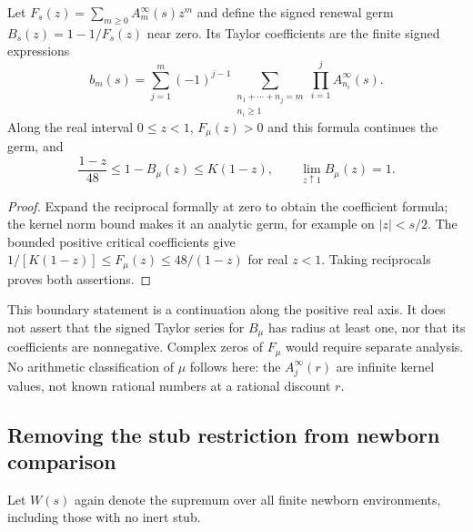 \begin{corollary}
\label{cr:renewal-boundary}
Let $F_s(z)=\sum_{m\ge0}A_m^\infty(s)z^m$ and define the signed
renewal germ $B_s(z)=1-1/F_s(z)$ near zero. Its Taylor coefficients are
the finite signed expressions
\[
 b_m(s)=
 \sum_{j=1}^{m}(-1)^{j-1}
 \sum_{\substack{n_1+\cdots+n_j=m\\n_i\ge1}}
 \prod_{i=1}^{j} A_{n_i}^\infty(s).
\]
Along the real interval
$0\le z<1$, $F_\mu(z)>0$ and this formula continues the germ, and
\[
 \frac{1-z}{48}\le1-B_\mu(z)\le K(1-z),
 \qquad \lim_{z\uparrow1}B_\mu(z)=1.
\]
\end{corollary}
\begin{proof}
Expand the reciprocal formally at zero to obtain the coefficient formula;
the kernel norm bound makes it an analytic germ, for example on
$|z|<s/2$. The bounded positive critical coefficients give
$1/[K(1-z)]\le F_\mu(z)\le48/(1-z)$ for real $z<1$.
Taking reciprocals proves both assertions.
\end{proof}

This boundary statement is a continuation along the positive real
axis.  It does not assert that the signed Taylor series for $B_\mu$
has radius at least one, nor that its coefficients are nonnegative.
Complex zeros of $F_\mu$ would require separate analysis.  No arithmetic
classification of $\mu$ follows here: the $A_j^\infty(r)$ are infinite
kernel values, not known rational numbers at a rational discount $r$.

\subsection{Removing the stub restriction from newborn comparison}

Let $W(s)$ again denote the supremum over all finite newborn environments,
including those with no inert stub.


